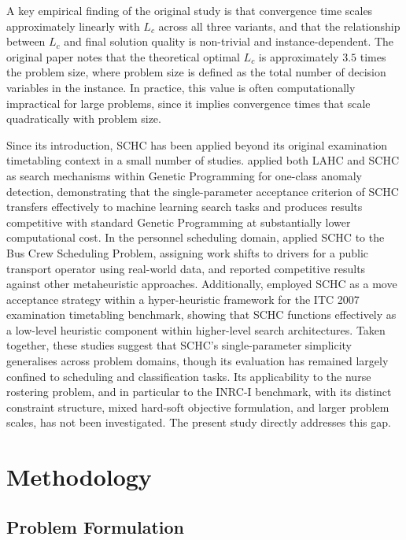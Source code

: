 \documentclass[12pt, a4paper, oneside]{report}
\begin{document}
\newpage
A key empirical finding of the original study is that convergence
time scales approximately linearly with $L_c$ across all three
variants, and that the relationship between $L_c$ and final solution
quality is non-trivial and instance-dependent. The original paper
notes that the theoretical optimal $L_c$ is approximately $3.5$
times the problem size, where problem size is defined as the total
number of decision variables in the instance. In practice, this value
is often computationally impractical for large problems, since it
implies convergence times that scale quadratically with problem size.

Since its introduction, SCHC has been applied beyond its original
examination timetabling context in a small number of studies.
\citet{Cao2017} applied both LAHC and SCHC as search mechanisms
within Genetic Programming for one-class anomaly detection,
demonstrating that the single-parameter acceptance criterion of SCHC
transfers effectively to machine learning search tasks and produces
results competitive with standard Genetic Programming at substantially
lower computational cost. In the personnel scheduling domain,
\citet{Souza2014} applied SCHC to the Bus Crew Scheduling Problem,
assigning work shifts to drivers for a public transport operator using
real-world data, and reported competitive results against other
metaheuristic approaches. Additionally, \citet{Hamidan2021} employed
SCHC as a move acceptance strategy within a hyper-heuristic framework
for the ITC 2007 examination timetabling benchmark, showing that SCHC
functions effectively as a low-level heuristic component within
higher-level search architectures. Taken together, these studies suggest
that SCHC's single-parameter simplicity generalises across problem
domains, though its evaluation has remained largely confined to
scheduling and classification tasks. Its applicability to the nurse
rostering problem, and in particular to the INRC-I benchmark, with its distinct constraint structure, mixed
hard-soft objective formulation, and larger problem scales, has not
been investigated. The present study directly addresses this gap.

\chapter{Methodology}
\label{ch:methodology}

\section{Problem Formulation}
\label{sec:problem_formulation}
\end{document}
